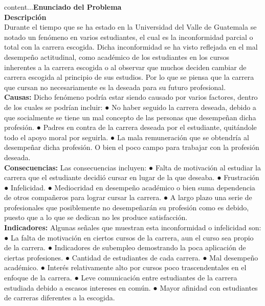 %


	content...\textbf{Enunciado del Problema}\\
	
	\textbf{Descripción}\\
	
	Durante el tiempo que se ha estado en la Universidad del Valle de Guatemala se notado un fenómeno en varios estudiantes, el cual es la inconformidad parcial o total con la carrera escogida. Dicha inconformidad se ha visto reflejada en el mal desempeño actitudinal, como académico de los estudiantes en los cursos inherentes a la carrera escogida o al observar que muchos deciden cambiar de carrera  escogida al principio de sus estudios. Por lo que se piensa que la carrera que cursan no necesariamente es la deseada para su futuro profesional.\\
	
	\textbf{Causas:} Dicho fenómeno podría estar siendo causado por varios factores, dentro de los cuales se podrían incluir: 
	●	No haber seguido la carrera deseada, debido a que socialmente se tiene un mal concepto de las personas que desempeñan dicha profesión. 
	●	Padres en contra de la carrera deseada por el estudiante, quitándole todo el apoyo moral por seguirla. 
	●	La mala remuneración que se obtendría al desempeñar dicha profesión. O bien el poco campo para trabajar con la profesión deseada.\\
	
	\textbf{Consecuencias:} Las consecuencias incluyen: 
	●	Falta de motivación al estudiar la carrera que el estudiante decidió cursar en lugar de la que deseaba. 
	●	Frustración 
	●	Infelicidad.
	●	Mediocridad en desempeño académico o bien suma dependencia de otros compañeros para lograr cursar la carrera.
	●	A largo plazo una serie de profesionales que posiblemente no desempeñarán su profesión como es debido, puesto que a lo que se dedican no les produce satisfacción. \\
	
	
	\textbf{Indicadores:} Algunas señales que muestran esta inconformidad o infelicidad son: 
	●	La falta de motivación en ciertos cursos de la carrera, aun el curso sea propio de la carrera. 
	●	Indicadores de subempleo  demostrando la poca aplicación de ciertas profesiones. 
	●	Cantidad de estudiantes de cada carrera.
	●	Mal desempeño académico.
	●	Interés relativamente alto por cursos poco trascendentales en el enfoque de la carrera.
	●	Leve comunicación entre estudiantes de la carrera estudiada debido a escasos intereses en común.
	●	Mayor afinidad con estudiantes de carreras diferentes a la escogida. \\
	
